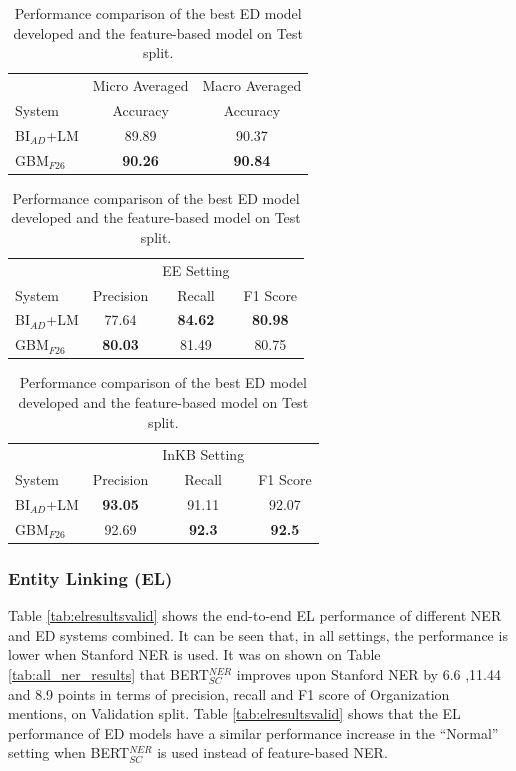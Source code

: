 \documentclass{report}
\theoremstyle{definition}
\theoremstyle{remark}
\begin{document}
\begin{table}
    \centering
    \begin{tabular}{lcc}
    &Micro Averaged & Macro Averaged\\
    System    & Accuracy &Accuracy \\
    \hline
    BI$_{AD}$+LM   & 89.89 & 90.37\\
    GBM$_{F26}$ & \textbf{90.26}&	\textbf{90.84}\\
    \end{tabular}
    
    \vspace{0.5cm}\begin{tabular}{lccc}
    &&EE Setting & \\
    System  & Precision & Recall & F1 Score \\
    \hline
     BI$_{AD}$+LM   &  77.64 &\textbf{84.62}& \textbf{80.98}\\
    GBM$_{F26}$   & \textbf{80.03}&	81.49&	80.75\\
    \end{tabular}
    
    \vspace{0.5cm}\begin{tabular}{lccc}
    &&InKB Setting & \\
    System  & Precision & Recall & F1 Score \\
    \hline
     BI$_{AD}$+LM    &  \textbf{93.05} &91.11 &92.07\\
    GBM$_{F26}$   & 92.69&	\textbf{92.3}&	\textbf{92.5}\\
    \end{tabular}
    		

    \caption{Performance comparison of the best ED model developed and the feature-based model on Test split.}
    \label{tab:edresultstest}
\end{table}


\subsubsection{Entity Linking (EL)}
Table \ref{tab:elresultsvalid} shows the end-to-end EL performance of different NER and ED systems combined. It can be seen that, in all settings, the performance is lower when Stanford NER is used. It was on shown on Table \ref{tab:all_ner_results} that BERT$_{SC}^{NER}$ improves upon Stanford NER by 6.6 ,11.44 and 8.9 points in terms of precision, recall and F1 score of Organization mentions, on Validation split. Table \ref{tab:elresultsvalid} shows that the EL performance of ED models have a similar performance increase in the ``Normal'' setting when BERT$_{SC}^{NER}$ is used instead of feature-based NER.
\end{document}
